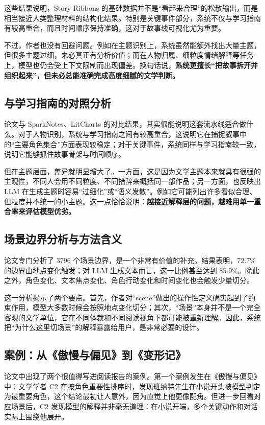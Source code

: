 \documentclass[a4paper,12pt,UTF8]{article}
\begin{document}
这些结果说明，Story Ribbons 的基础数据并不是“看起来合理”的松散输出，而是相当接近人类整理材料的结构化结果。特别是关键事件部分，系统不仅与学习指南有较高重合，而且时间顺序保持准确，这对于故事线可视化尤为重要。

不过，作者也没有回避问题。例如在主题识别上，系统虽然能额外找出大量主题，但很多主题过细，未必真正有分析价值；而在人物归属、细粒度情绪解释等任务上，模型也仍会受上下文限制而出现偏差。换句话说，\textbf{系统更擅长“把故事拆开并组织起来”，但未必总能准确完成高度细腻的文学判断。}

\subsection{与学习指南的对照分析}
论文与 SparkNotes、LitCharts 的对比结果，其实很能说明这套流水线适合做什么。对于人物识别，系统与学习指南之间有较高重合，这说明它在捕捉叙事中的“主要角色集合”方面表现较稳定；对于关键事件，系统同样与学习指南较一致，说明它能够抓住故事骨架与时间顺序。

但在主题层面，差异就明显增大了。一方面，这是因为文学主题本来就具有很强的主观性，不同人会用不同粒度、不同措辞来概括同一部作品；另一方面，也反映出 LLM 在生成主题时容易“过细化”或“语义发散”。例如它可能列出许多看似合理、但粒度并不统一的小主题。这一点恰恰说明：\textbf{越接近解释层的问题，越难用单一重合率来评估模型优劣。}

\subsection{场景边界分析与方法含义}
论文专门分析了 3796 个场景边界，是一个非常有价值的补充。结果表明，72.7\% 的边界由地点变化触发；对 LLM 生成文本而言，这一比例甚至达到 85.9\%。除此之外，角色变化、文本焦点变化、角色行动变化和时间变化也会触发少量切分。

这一分析揭示了两个要点。首先，作者对“scene”做出的操作性定义确实起到了约束作用，模型大多数时候会按照地点变化切分；其次，“场景”本身并不是一个完全客观的文学单位，它在不同体裁和不同阅读视角下都可能被重新理解。因此，系统把“为什么这里切场景”的解释暴露给用户，是非常必要的设计。

\subsection{案例：从《傲慢与偏见》到《变形记》}
论文中出现了两个很值得写进阅读报告的案例。第一个案例发生在《傲慢与偏见》中：文学学者 C2 在按角色重要性排序时，发现班纳特先生在小说开头被模型判定为最重要角色，这个结论最初让人意外，因为直觉上他更像配角。但进一步回看对应场景后，C2 发现模型的解释并非毫无道理：在小说开端，多个关键动作和对话实际上围绕他展开。
\end{document}
